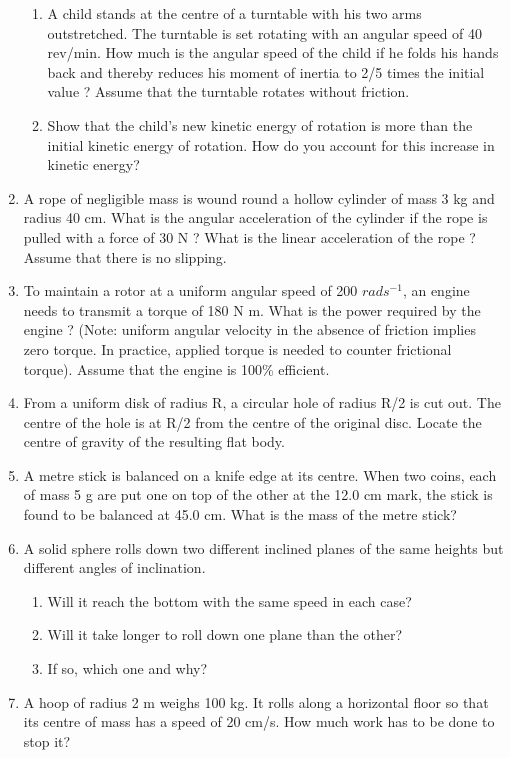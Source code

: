 \begin{enumerate}[label=\arabic*.,ref=\thesubsection.\theenumi]
\begin{enumerate}[label=(\alph*)]
\item  A child stands at the centre of a turntable with his two arms outstretched. The turntable is set rotating with an angular speed of 40 rev/min. How much is the angular speed of the child if he folds his hands back and thereby reduces his moment of inertia to 2/5 times the initial value ? Assume that the turntable rotates without friction.
\item Show that the child's new kinetic energy of rotation is more than the initial kinetic energy of rotation. How do you account for this increase in kinetic energy?
\end{enumerate}
\item  A rope of negligible mass is wound round a hollow cylinder of mass 3 kg and radius 40 cm. What is the angular acceleration of the cylinder if the rope is pulled with a force of 30 N ? What is the linear acceleration of the rope ? Assume that there is no slipping.
\item  To maintain a rotor at a uniform angular speed of 200 $rad s^{-1}$, an engine needs to transmit a torque of 180 N m. What is the power required by the engine ? (Note: uniform angular velocity in the absence of friction implies zero torque. In practice, applied torque is needed to counter frictional torque). Assume that the engine is 100\% efficient.
\item  From a uniform disk of radius R, a circular hole of radius R/2 is cut out. The centre of the hole is at R/2 from the centre of the original disc. Locate the centre of gravity of the resulting flat body.
\item  A metre stick is balanced on a knife edge at its centre. When two coins, each of mass 5 g are put one on top of the other at the 12.0 cm mark, the stick is found to be balanced at 45.0 cm. What is the mass of the metre stick?
\item A solid sphere rolls down two different inclined planes of the same heights but different angles of inclination. 
\begin{enumerate}[label=(\alph*)]
\item  Will it reach the bottom with the same speed in each case? 
\item  Will it take longer to roll down one plane than the other? 
\item  If so, which one and why?
\end{enumerate}
\item  A hoop of radius 2 m weighs 100 kg. It rolls along a horizontal floor so that its centre of mass has a speed of 20 cm/s. How much work has to be done to stop it? 

\end{enumerate}
